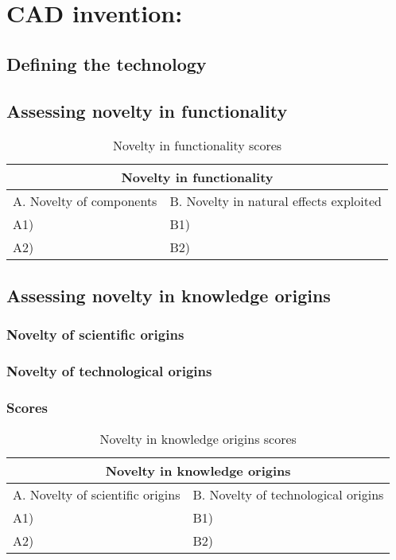 \section{CAD invention: }
\subsection{Defining the technology}

\subsection{Assessing novelty in functionality}
\begin{table}[h]
\centering
\begin{tabular}{l l}
\hline
\multicolumn{2}{|c|}{Novelty in functionality} \\
\hline
A. Novelty of components & B. Novelty in natural effects exploited\\
A1) & B1)\\ 
A2) & B2)\\ 
\hline
\end{tabular}
\caption{Novelty in functionality scores}
\label{tbl:funcscores5}
\end{table}

\subsection{Assessing novelty in knowledge origins}
\subsubsection{Novelty of scientific origins}

\subsubsection{Novelty of technological origins}

\subsubsection{Scores}
\begin{table}[h]
\centering
\begin{tabular}{l l}
\hline
\multicolumn{2}{|c|}{Novelty in knowledge origins} \\
\hline
A. Novelty of scientific origins & B. Novelty of technological origins\\
A1) & B1)\\ 
A2) & B2)\\ 
\hline
\end{tabular}
\caption{Novelty in knowledge origins scores}
\label{tbl:origscores5}
\end{table}

